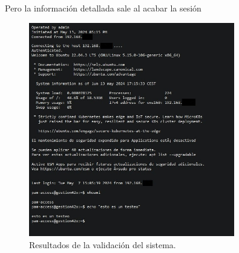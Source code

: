Pero la información detallada sale al acabar la sesión
\begin{figure}[H]
	\centering
	\includegraphics[width=0.8\textwidth]{./img/reporte_html.jpg}
	\caption{Resultados de la validación del sistema.}
	\label{fig:reporte_html}
\end{figure}



